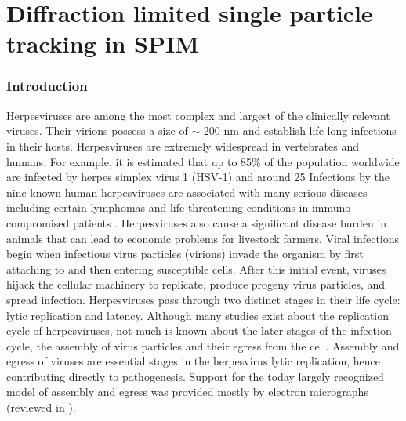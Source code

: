 \ifpdf
    \graphicspath{{Chapters/spt/Figs/Raster/}{Chapters/spt/Figs/PDF/}{Chapters/spt/Figs/}}
\else
    \graphicspath{{Chapters/spt/Figs/Vector/}{Chapters/spt/Figs/}}
\fi

\chapter{Diffraction limited single particle tracking in SPIM}

\subsection{Introduction}
Herpesviruses are among the most complex and largest of the clinically relevant viruses.
Their virions possess a size of $\sim$ 200 nm and establish life-long infections in their hosts.
Herpesviruses are extremely widespread in vertebrates and humans.
For example, it is estimated that up to 85\% of the population worldwide are infected by herpes simplex virus 1 (HSV-1) and around 25%
Infections by the nine known human herpesviruses are associated with many serious diseases including certain lymphomas and life-threatening conditions in immuno-compromised patients \cite{[1]}.
Herpesviruses also cause a significant disease burden in animals that can lead to economic problems for livestock farmers.
Viral infections begin when infectious virus particles (virions) invade the organism by first attaching to and then entering susceptible cells.
After this initial event, viruses hijack the cellular machinery to replicate, produce progeny virus particles, and spread infection.
Herpesviruses pass through two distinct stages in their life cycle: lytic replication and latency.
Although many studies exist about the replication cycle of herpesviruses, not much is known about the later stages of the infection cycle, the assembly of virus particles and their egress from the cell.
Assembly and egress of viruses are essential stages in the herpesvirus lytic replication, hence contributing directly to pathogenesis.
Support for the today largely recognized model of assembly and egress was provided mostly by electron micrographs (reviewed in \cite{[2, 3]}).

